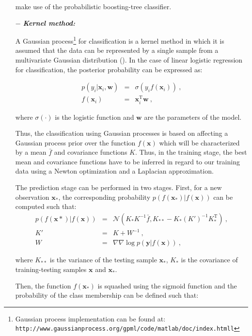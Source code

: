 \begin{enumerate}[leftmargin=*]
\cite{Tiwari2009a,Tiwari2012,Tiwari2010,Viswanath2011} make use of the probabilistic boosting-tree classifier.

\item[$-$] \textbf{\textit{Kernel method:}}

A Gaussian process\footnote{Gaussian process implementation can be found at: \texttt{http://www.gaussianprocess.org/gpml/\allowbreak code/matlab/doc/index.htmll}} for classification is a kernel method in which it is assumed that the data can be represented by a single sample from a multivariate Gaussian distribution (\cite{Rasmussen2005}). In the case of linear logistic regression for classification, the posterior probability can be expressed as:

\begin{eqnarray}
	p(y_i|\mathbf{x}_i,\mathbf{w}) & = & \sigma(y_i f(\mathbf{x}_i)) \ , \label{eq:gp1} \\
	f(\mathbf{x}_i) & = & \mathbf{x}_i^{\text{T}} \mathbf{w} \ , \nonumber
\end{eqnarray}

\noindent where $\sigma(\cdot)$ is the logistic function and $\mathbf{w}$ are the parameters of the model.

Thus, the classification using Gaussian processes is based on affecting a Gaussian process prior over the function $f(\mathbf{x})$ which will be characterized by a mean $\bar{f}$ and covariance functions $K$. Thus, in the training stage, the best mean and covariance functions have to be inferred in regard to our training data using a Newton optimization and a Laplacian approximation.

The prediction stage can be performed in two stages. First, for a new observation $\mathbf{x}_*$, the corresponding probability $p(f(\mathbf{x}_*)|f(\mathbf{x}))$ can be computed such that:
\begin{eqnarray}
	p(f(\mathbf{x}*)|f(\mathbf{x})) & = & \mathcal{N}( K_*K^{-1}\bar{f}, K_{**}-K_*(K')^{-1}K_*^{\text{T}} ) \ , \nonumber \\
	K' & = & K + W^{-1} \ , \label{eq:gp2} \\
	W & = & \nabla \nabla \log p(\mathbf{y}|f(\mathbf{x})) \ , \nonumber
\end{eqnarray}

\noindent where $K_{**}$ is the variance of the testing sample $\mathbf{x}_*$, $K_{*}$ is the covariance of training-testing samples $\mathbf{x}$ and $\mathbf{x}_*$.

Then, the function $f(\mathbf{x}_*)$ is squashed using the sigmoid function and the probability of the class membership can be defined such that:


\end{enumerate}
